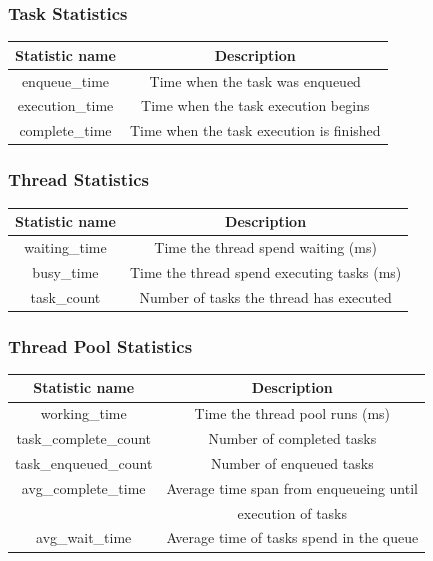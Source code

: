 \documentclass{beamer}
\begin{document}
\begin{frame}
	\frametitle{Task Statistics}
	\begin{center}
		\begin{tabular}{ c c }
			\hline
			\textbf{Statistic name}&\textbf{Description}\\
			\hline
			enqueue\_time & Time when the task was enqueued \\
			execution\_time & Time when the task execution begins \\
			complete\_time & Time when the task execution is finished \\
			\hline
		\end{tabular}
		\label{tab2}
	\end{center}
\end{frame}

\begin{frame}
	\frametitle{Thread Statistics}
	\begin{center}
		\begin{tabular}{ c c }
			\hline
			\textbf{Statistic name}&\textbf{Description}\\
			\hline
			waiting\_time & Time the thread spend waiting (ms) \\
			busy\_time & Time the thread spend executing tasks (ms)\\
			task\_count & Number of tasks the thread has executed \\
			\hline
		\end{tabular}
		\label{tab3}
	\end{center}
\end{frame}

\begin{frame}
	\frametitle{Thread Pool Statistics}
	\begin{center}
		\begin{tabular}{ c c }
			\hline
			\textbf{Statistic name}&\textbf{Description}\\
			\hline
			working\_time & Time the thread pool runs (ms) \\
			task\_complete\_count & Number of completed tasks \\
			task\_enqueued\_count & Number of enqueued tasks \\
			avg\_complete\_time & Average time span from enqueueing until \\
			& execution of tasks \\
			avg\_wait\_time & Average time of tasks spend in the queue \\
			\hline
		\end{tabular}
		\label{tab4}
	\end{center}
\end{frame}
\end{document}

